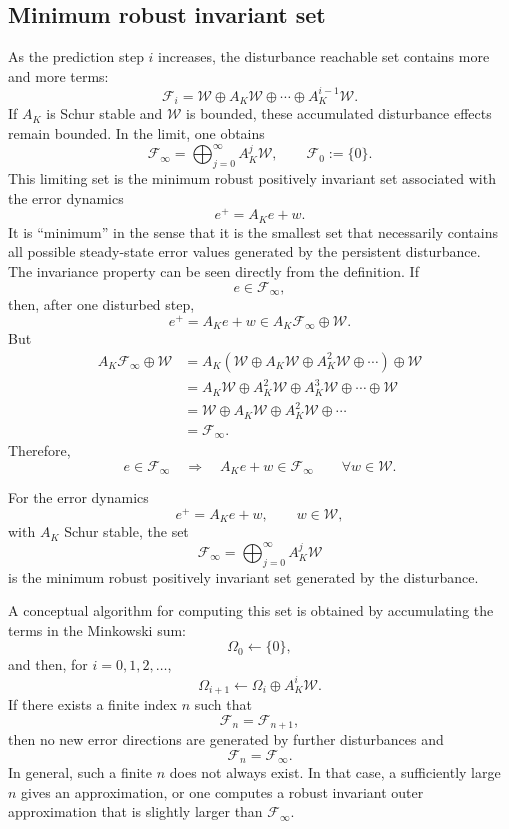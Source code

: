 \subsection{Minimum robust invariant set}

As the prediction step \(i\) increases, the disturbance reachable set contains more and more
terms:
\[
    \mathcal F_i
    =
    \mathcal W\oplus A_K\mathcal W\oplus\cdots\oplus A_K^{i-1}\mathcal W.
\]
If \(A_K\) is Schur stable and \(\mathcal W\) is bounded, these accumulated disturbance effects
remain bounded. In the limit, one obtains
\[
    \mathcal F_\infty
    =
    \bigoplus_{j=0}^{\infty}A_K^j\mathcal W,
    \qquad
    \mathcal F_0:=\{0\}.
\]
This limiting set is the minimum robust positively invariant set associated with the error
dynamics
\[
    e^+=A_Ke+w.
\]
It is ``minimum'' in the sense that it is the smallest set that necessarily contains all possible
steady-state error values generated by the persistent disturbance.\\
The invariance property can be seen directly from the definition. If
\[
    e\in\mathcal F_\infty,
\]
then, after one disturbed step,
\[
    e^+=A_Ke+w\in A_K\mathcal F_\infty\oplus\mathcal W.
\]
But
\[
\begin{aligned}
    A_K\mathcal F_\infty\oplus\mathcal W
    &=
    A_K\left(
    \mathcal W\oplus A_K\mathcal W\oplus A_K^2\mathcal W\oplus\cdots
    \right)
    \oplus\mathcal W                                      \\
    &=
    A_K\mathcal W\oplus A_K^2\mathcal W\oplus A_K^3\mathcal W\oplus\cdots
    \oplus\mathcal W                                      \\
    &=
    \mathcal W\oplus A_K\mathcal W\oplus A_K^2\mathcal W\oplus\cdots       \\
    &=
    \mathcal F_\infty.
\end{aligned}
\]
Therefore,
\[
    e\in\mathcal F_\infty
    \quad\Longrightarrow\quad
    A_Ke+w\in\mathcal F_\infty
    \qquad
    \forall w\in\mathcal W.
\]

\begin{theorembox}
For the error dynamics
\[
    e^+=A_Ke+w,
    \qquad w\in\mathcal W,
\]
with \(A_K\) Schur stable, the set
\[
    \mathcal F_\infty
    =
    \bigoplus_{j=0}^{\infty}A_K^j\mathcal W
\]
is the minimum robust positively invariant set generated by the disturbance.
\end{theorembox}

A conceptual algorithm for computing this set is obtained by accumulating the terms in the
Minkowski sum:
\[
    \Omega_0\leftarrow\{0\},
\]
and then, for \(i=0,1,2,\ldots\),
\[
    \Omega_{i+1}\leftarrow \Omega_i\oplus A_K^i\mathcal W.
\]
If there exists a finite index \(n\) such that
\[
    \mathcal F_n=\mathcal F_{n+1},
\]
then no new error directions are generated by further disturbances and
\[
    \mathcal F_n=\mathcal F_\infty.
\]
In general, such a finite \(n\) does not always exist. In that case, a sufficiently large \(n\)
gives an approximation, or one computes a robust invariant outer approximation that is slightly
larger than \(\mathcal F_\infty\).

